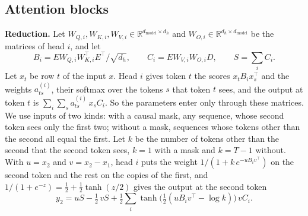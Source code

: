 \documentclass[10pt]{article}
\theoremstyle{definition}
\theoremstyle{remark}
\newcommand{\R}{\mathbb{R}}
\newcommand{\dm}{d_{\mathrm{model}}}
\newcommand{\para}[1]{\smallskip\noindent\textbf{#1}\hspace{0.5em}}
\begin{document}
\subsection*{Attention blocks}

\para{Reduction.} Let $W_{Q,i}, W_{K,i}, W_{V,i} \in \R^{\dm\times d_h}$ and $W_{O,i} \in \R^{d_h\times\dm}$ be the matrices of head $i$, and let
\[
B_i = EW_{Q,i}W_{K,i}^\top E^\top/\sqrt{d_h}, \qquad C_i = EW_{V,i}W_{O,i}D, \qquad S = \textstyle\sum_i C_i .
\]
Let $x_t$ be row $t$ of the input $x$. Head $i$ gives token $t$ the scores $x_tB_ix_s^\top$ and the weights $a^{(i)}_{ts}$, their softmax over the tokens $s$ that token $t$ sees, and the output at token $t$ is $\sum_i\sum_s a^{(i)}_{ts}\,x_sC_i$. So the parameters enter only through these matrices. We use inputs of two kinds: with a causal mask, any sequence, whose second token sees only the first two; without a mask, sequences whose tokens other than the second all equal the first. Let $k$ be the number of tokens other than the second that the second token sees, $k = 1$ with a mask and $k = T - 1$ without. With $u = x_2$ and $v = x_2 - x_1$, head $i$ puts the weight $1/(1 + k\,e^{-uB_iv^\top})$ on the second token and the rest on the copies of the first, and $1/(1 + e^{-z}) = \tfrac12 + \tfrac12\tanh(z/2)$ gives the output at the second token
\begin{equation}\label{eq:twotok}
y_2 = uS - \tfrac12\,vS + \tfrac12\sum_i \tanh\big(\tfrac12(uB_iv^\top - \log k)\big)\,vC_i .
\end{equation}
\end{document}
